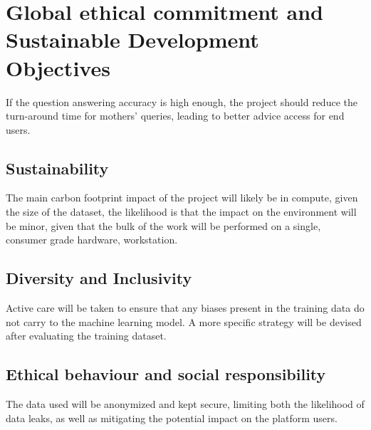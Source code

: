 \section{Global ethical commitment and Sustainable Development Objectives}
If the question answering accuracy is high enough, the project should reduce the turn-around time for mothers' queries, leading to better advice access for end users.
\subsection{Sustainability}
The main carbon footprint impact of the project will likely be in compute, given the size of the dataset, the likelihood is that the impact on the environment will be minor, given that the bulk of the work will be performed on a single, consumer grade hardware, workstation.
\subsection{Diversity and Inclusivity}
Active care will be taken to ensure that any biases present in the training data do not carry to the machine learning model. A more specific strategy will be devised after evaluating the training dataset.
\subsection{Ethical behaviour and social responsibility}
The data used will be anonymized and kept secure, limiting both the likelihood of data leaks, as well as mitigating the potential impact on the platform users. 